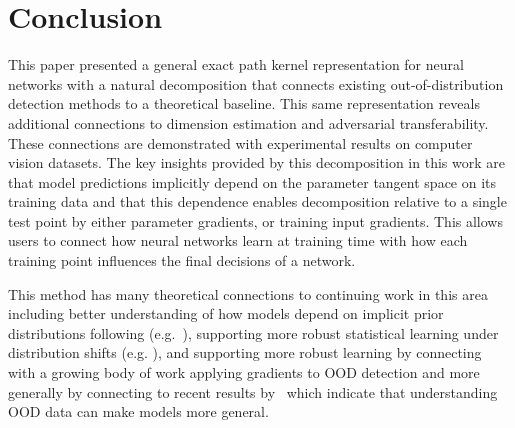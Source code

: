 

\section{Conclusion}

This paper presented a general exact path kernel representation for neural networks with a natural decomposition that connects existing out-of-distribution detection methods to a theoretical baseline. This same representation reveals additional connections to dimension estimation and adversarial transferability. These connections are demonstrated with experimental results on computer vision datasets. The key insights provided by this decomposition in this work are that model predictions implicitly depend on the parameter tangent space on its training data and that this dependence enables decomposition relative to a single test point by either parameter gradients, or training input gradients. This allows users to connect how neural networks learn at training time with how each training point influences the final decisions of a network.

This method has many theoretical connections to continuing work in this area including better understanding of how models depend on implicit prior distributions following (e.g.~\citet{nagler2023}), supporting more robust statistical learning under distribution shifts (e.g. \citet{Simchowitz2023}), and supporting more robust learning by connecting with a growing body of work applying gradients to OOD detection and more generally by connecting to recent results by~\citet{desilva2023} which indicate that understanding OOD data can make models more general. 

\newpage




%
%
